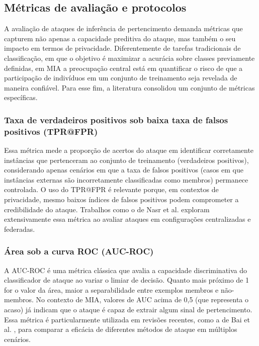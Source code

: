 \documentclass[
	12pt,				%
	openright,			%
	oneside,			%
	a4paper,			%
	english,			%
	french,				%
	spanish,			%
	brazil,				%
	]{abntex2}
\begin{document}
\subsection{Métricas de avaliação e protocolos}
\label{subsec:mia_metricas}

A avaliação de ataques de inferência de pertencimento demanda métricas que capturem não apenas a capacidade preditiva do ataque, mas também o seu impacto em termos de privacidade. Diferentemente de tarefas tradicionais de classificação, em que o objetivo é maximizar a acurácia sobre classes previamente definidas, em MIA a preocupação central está em quantificar o risco de que a participação de indivíduos em um conjunto de treinamento seja revelada de maneira confiável. Para esse fim, a literatura consolidou um conjunto de métricas específicas.

\subsubsection{\textbf{Taxa de verdadeiros positivos sob baixa taxa de falsos positivos (TPR@FPR)}}
Essa métrica mede a proporção de acertos do ataque em identificar corretamente instâncias que pertenceram ao conjunto de treinamento (verdadeiros positivos), considerando apenas cenários em que a taxa de falsos positivos (casos em que instâncias externas são incorretamente classificadas como membros) permanece controlada. O uso do TPR@FPR é relevante porque, em contextos de privacidade, mesmo baixos índices de falsos positivos podem comprometer a credibilidade do ataque. Trabalhos como o de Nasr et al. \cite{nasr2019comprehensive} exploram extensivamente essa métrica ao avaliar ataques em configurações centralizadas e federadas.

\subsubsection{\textbf{Área sob a curva ROC (AUC-ROC)}}
A AUC-ROC é uma métrica clássica que avalia a capacidade discriminativa do classificador de ataque ao variar o limiar de decisão. Quanto mais próximo de 1 for o valor da área, maior a separabilidade entre exemplos membros e não-membros. No contexto de MIA, valores de AUC acima de 0,5 (que representa o acaso) já indicam que o ataque é capaz de extrair algum sinal de pertencimento. Essa métrica é particularmente utilizada em revisões recentes, como a de Bai et al. \cite{bai2024survey}, para comparar a eficácia de diferentes métodos de ataque em múltiplos cenários.
\end{document}
